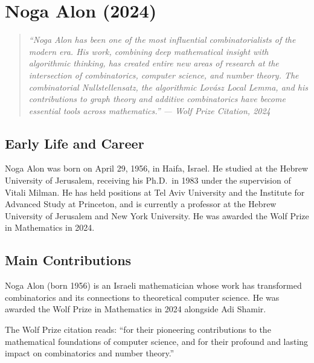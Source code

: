 
\chapter{Noga Alon (2024)}

\begin{quote}
\it ``Noga Alon has been one of the most influential combinatorialists of the modern era. His work, combining deep mathematical insight with algorithmic thinking, has created entire new areas of research at the intersection of combinatorics, computer science, and number theory. The combinatorial Nullstellensatz, the algorithmic Lov\'asz Local Lemma, and his contributions to graph theory and additive combinatorics have become essential tools across mathematics.'' --- Wolf Prize Citation, 2024
\end{quote}

\section{Early Life and Career}

Noga Alon was born on April 29, 1956, in Haifa, Israel. He studied at the Hebrew University of Jerusalem, receiving his Ph.D.\ in 1983 under the supervision of Vitali Milman. He has held positions at Tel Aviv University and the Institute for Advanced Study at Princeton, and is currently a professor at the Hebrew University of Jerusalem and New York University. He was awarded the Wolf Prize in Mathematics in 2024.

\section{Main Contributions}

Noga Alon (born 1956) is an Israeli mathematician whose work has transformed combinatorics and its connections to theoretical computer science. He was awarded the Wolf Prize in Mathematics in 2024 alongside Adi Shamir.

The Wolf Prize citation reads: ``for their pioneering contributions to the mathematical foundations of computer science, and for their profound and lasting impact on combinatorics and number theory.''

